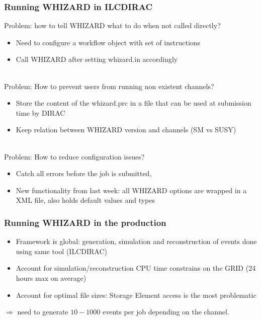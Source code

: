 \documentclass{beamer}
\newcommand{\whizard}{WHIZARD\xspace}
\begin{document}
\begin{frame}
\frametitle{Running \whizard in ILCDIRAC}
Problem: how to tell \whizard what to do when not called directly?
\begin{itemize}
  \item Need to  configure a workflow object with set of instructions
  \item Call \whizard after setting whizard.in accordingly
\end{itemize}
~\\
Problem: How to prevent users from running non existent channels?
\begin{itemize}
  \item Store the content of the whizard.prc in a file that can be used at
  submission time by DIRAC
  \item Keep relation between \whizard version and channels (SM vs SUSY)
\end{itemize}
~\\
Problem: How to reduce configuration issues?
\begin{itemize}
  \item Catch all errors before the job is submitted,
  \item New functionality from last week: all \whizard options are wrapped in a
  XML file, also holds default values and types
\end{itemize}
\end{frame}

\begin{frame}
\frametitle{Running \whizard in the production}
\begin{itemize}
  \item Framework is global: generation, simulation and reconstruction of events
  done using same tool (ILCDIRAC)
  \item Account for simulation/reconstruction CPU time constrains on the GRID
  (24 hours max on average)
  \item Account for optimal file sizes: Storage Element access is the most
  problematic
\end{itemize}
$\Rightarrow$ \alert{need to generate $10-1000$ events per job} depending on the
channel.
\end{frame}
\end{document}
